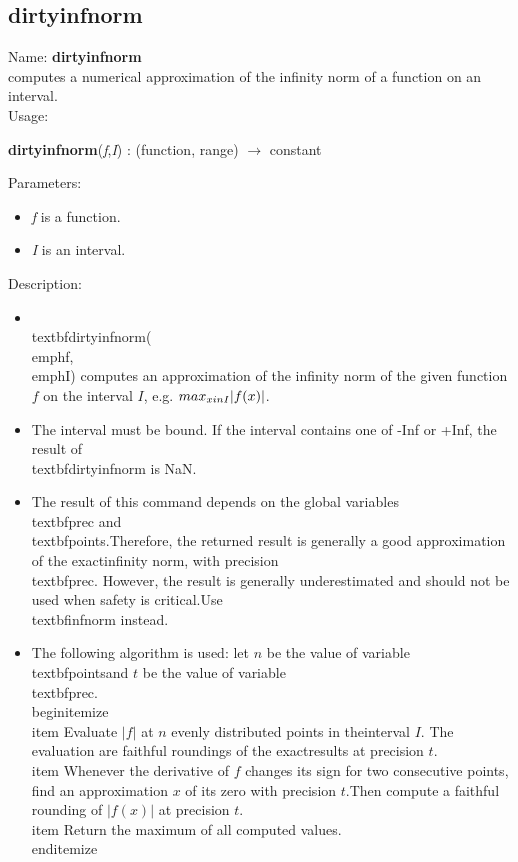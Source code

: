 \subsection{dirtyinfnorm}
\label{labdirtyinfnorm}
\noindent Name: \textbf{dirtyinfnorm}\\
computes a numerical approximation of the infinity norm of a function on an interval.\\
\noindent Usage: 
\begin{center}
\textbf{dirtyinfnorm}(\emph{f},\emph{I}) : (\textsf{function}, \textsf{range}) $\rightarrow$ \textsf{constant}\\
\end{center}
Parameters: 
\begin{itemize}
\item \emph{f} is a function.
\item \emph{I} is an interval.
\end{itemize}
\noindent Description: \begin{itemize}

\item \\textbf{dirtyinfnorm}(\\emph{f},\\emph{I}) computes an approximation of the infinity norm of the \n   given function $f$ on the interval $I$, e.g. $\\max_{x \\in I} \\{|f(x)|\\}$.\n
\item The interval must be bound. If the interval contains one of -Inf or +Inf, the \n   result of \\textbf{dirtyinfnorm} is NaN.\n
\item The result of this command depends on the global variables \\textbf{prec} and \\textbf{points}.\n   Therefore, the returned result is generally a good approximation of the exact\n   infinity norm, with precision \\textbf{prec}. However, the result is generally \n   underestimated and should not be used when safety is critical.\n   Use \\textbf{infnorm} instead.\n
\item The following algorithm is used: let $n$ be the value of variable \\textbf{points}\n   and $t$ be the value of variable \\textbf{prec}.\n   \\begin{itemize}\n   \\item Evaluate $|f|$ at $n$ evenly distributed points in the\n     interval $I$. The evaluation are faithful roundings of the exact\n     results at precision $t$.\n   \\item Whenever the derivative of $f$ changes its sign for two consecutive \n     points, find an approximation $x$ of its zero with precision $t$.\n     Then compute a faithful rounding of $|f(x)|$ at precision $t$.\n   \\item Return the maximum of all computed values.\n   \\end{itemize}\n\end{itemize}
